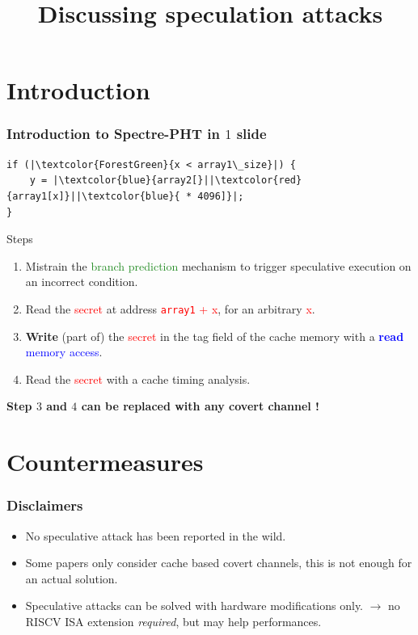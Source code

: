 \documentclass[11pt]{beamer}
\title{Discussing speculation attacks}
\institute{uSC SIG / RISCV}
\begin{document}
\maketitle

\section{Introduction}


\begin{frame}[fragile]
    \frametitle{Introduction to Spectre-PHT in $1$ slide}

    \begin{verbatim}
if (|\textcolor{ForestGreen}{x < array1\_size}|) {
    y = |\textcolor{blue}{array2[}||\textcolor{red}{array1[x]}||\textcolor{blue}{ * 4096]}|;
}
    \end{verbatim}

    \begin{block}{Steps}
        \begin{enumerate}
            \item Mistrain the \textcolor{ForestGreen}{branch prediction} mechanism to trigger speculative execution on an incorrect condition.
            \item Read the \textcolor{red}{secret} at address \textcolor{red}{\texttt{array1} + x}, for an arbitrary \textcolor{red}{x}.
            \item \textbf{Write} (part of) the \textcolor{red}{secret} in the tag field of the cache memory with a \textcolor{blue}{\textbf{read} memory access}.
            \item Read the \textcolor{red}{secret} with a cache timing analysis.
        \end{enumerate}
        
    \end{block}

    \begin{center}
        \textbf{Step $3$ and $4$ can be replaced with any covert channel !}
    \end{center}

\end{frame}

\section{Countermeasures}
\frame{\sectionpage}

\begin{frame}
    \frametitle{Disclaimers}

    \begin{itemize}
        \item No speculative attack has been reported in the wild.
        \item Some papers only consider cache based covert channels, this is not enough for an actual solution.
        \item Speculative attacks can be solved with hardware modifications only. $\rightarrow$ no RISCV ISA extension \textit{required}, but may help performances.
    \end{itemize}
        

\end{frame}
\end{document}
